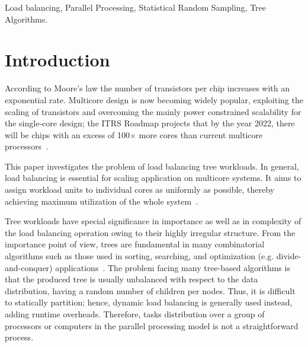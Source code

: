 \documentclass[conference,compsoc]{IEEEtran}
\begin{document}
\begin{IEEEkeywords}
	Load balancing, Parallel Processing, Statistical Random Sampling, Tree Algorithms.
\end{IEEEkeywords}




%
\IEEEpeerreviewmaketitle
\section{Introduction}
	According to Moore's law the number of transistors per chip increases with an exponential rate. Multicore design is now becoming widely popular, exploiting the scaling of transistors and overcoming the mainly power constrained scalability for the single-core design; the {ITRS} Roadmap projects that by the year 2022, there will be chips with an excess of 100$\times$ more cores than current multicore processors~\cite{Blake2009, Semiconductors2007}.
	
	This paper investigates the problem of load balancing tree workloads. In general, load balancing is essential for scaling application on multicore systems. It aims to assign workload units to individual cores as uniformly as possible, thereby achieving maximum utilization of the whole system~\cite{xu1997load}.
	
	Tree workloads have special significance in importance as well as in complexity of the load balancing operation owing to their highly irregular structure. From the importance point of view, trees are fundamental in many combinatorial algorithms such as those used in sorting, searching, and optimization (e.g. divide-and-conquer) applications~\cite{Knuth1997, Olivier2007}. The problem facing many tree-based algorithms is that the produced tree is usually unbalanced with respect to the data distribution, having a random number of children per nodes. Thus, it is difficult to statically partition; hence, dynamic load balancing is generally used instead, adding runtime overheads. Therefore, tasks distribution over a group of processors or computers in the parallel processing model is not a straightforward process.
	
\end{document}
